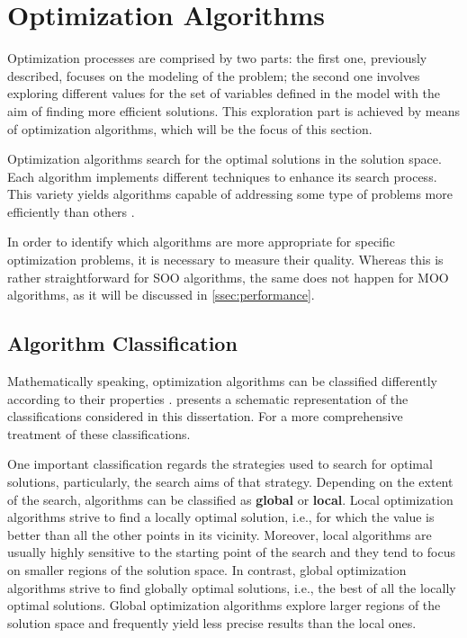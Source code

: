 \section{Optimization Algorithms}
\label{sec:optimizationalgorithms}
	
	Optimization processes are comprised by two parts: the first one, previously described, focuses on the modeling of the problem; the second one involves exploring different values for the set of variables defined in the model with the aim of finding more efficient solutions. This exploration part is achieved by means of optimization algorithms, which will be the focus of this section. 
	
	Optimization algorithms search for the optimal solutions in the solution space. Each algorithm implements different techniques to enhance its search process. This variety yields algorithms capable of addressing some type of problems more efficiently than others \cite{Wolpert1997NFLT}.
	
	In order to identify which algorithms are more appropriate for specific optimization problems, it is necessary to measure their quality. Whereas this is rather straightforward for \ac{SOO} algorithms, the same does not happen for \ac{MOO} algorithms, as it will be discussed in \cref{ssec:performance}.
	
	\subsection{Algorithm Classification}	
	Mathematically speaking, optimization algorithms can be classified differently according to their properties \cite{Koziel2011, Nocedal2011NumericalOptimization}.  presents a schematic representation of the classifications considered in this dissertation. For a more comprehensive treatment of these classifications.
	
	One important classification regards the strategies used to search for optimal solutions, particularly, the search aims of that strategy. Depending on the extent of the search, algorithms can be classified as \textbf{global} or \textbf{local}. Local optimization algorithms strive to find a locally optimal solution, i.e., for which the value is better than all the other points in its vicinity. Moreover, local algorithms are usually highly sensitive to the starting point of the search and they tend to focus on smaller regions of the solution space. In contrast, global optimization algorithms strive to find globally optimal solutions, i.e., the best of all the locally optimal solutions. Global optimization algorithms explore larger regions of the solution space and frequently yield less precise results than the local ones.
	
